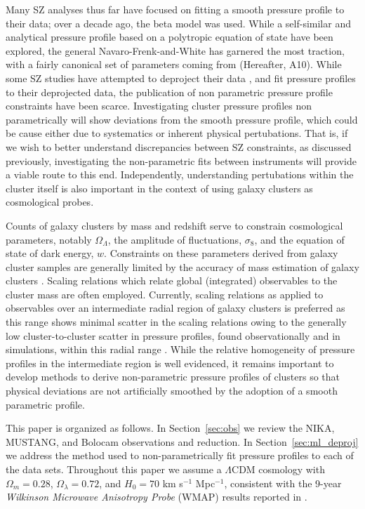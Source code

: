 \documentclass[iop,numberedappendix,apj]{emulateapj}
\begin{document}
Many SZ analyses thus far have focused on fitting a smooth pressure profile to their data; over a decade ago, the beta model
\citep{cavaliere1978} was used. While a self-similar \citep{mroczkowski2009} and analytical pressure profile based on a
polytropic equation of state \citep{bulbul2010} have been explored, the general Navaro-Frenk-and-White
\citep[gNFW][]{nagai2007} has garnered the most traction, with a fairly canonical set of parameters coming from
\citet{arnaud2010} (Hereafter, A10). While some SZ studies have attempted to deproject their data \citep[e.g.][]{sayers2013},
and fit pressure profiles to their deprojected data, the publication of non parametric pressure profile constraints have
been scarce. Investigating cluster pressure profiles non parametrically will show deviations from the smooth pressure profile,
which could be cause either due to systematics or inherent physical pertubations. That is, if we wish to better understand
discrepancies between SZ constraints, as discussed previously, investigating the non-parametric fits between instruments will
provide a viable route to this end. Independently, understanding pertubations within the cluster itself is also important in
the context of using galaxy clusters as cosmological probes.

Counts of galaxy clusters by mass and redshift serve to constrain cosmological parameters, notably $\Omega_{\Lambda}$,
the amplitude of fluctuations, $\sigma_8$, and the equation of state of dark energy, $w$. Constraints on these
parameters derived from galaxy cluster samples are generally limited by the accuracy of mass estimation of 
galaxy clusters \citep[e.g.][]{hasselfield2013, reichardt2013}. Scaling relations which relate global (integrated) observables
to the cluster mass are often employed. Currently, scaling relations as applied to observables over an intermediate radial
region of galaxy clusters is preferred as this range shows minimal scatter in the scaling relations \citep[e.g.][]{kravtsov2012}
owing to the generally low cluster-to-cluster scatter in pressure profiles, found observationally and in simulations,
within this radial range \citep[e.g.][]{borgani2004,nagai2007,arnaud2010,bonamente2012,planck2013a,sayers2013}.
While the relative homogeneity of pressure profiles in the intermediate region is well evidenced, it remains important to
develop methods to derive non-parametric pressure profiles of clusters so that physical deviations are not artificially
smoothed by the adoption of a smooth parametric profile. 

This paper is organized as follows. In Section~\ref{sec:obs} we review the NIKA, MUSTANG, and Bolocam observations and reduction. 
In Section~\ref{sec:ml_deproj} we address the method used to non-parametrically fit pressure profiles to each of the data sets.
Throughout this paper we assume a $\Lambda$CDM cosmology with $\Omega_m = 0.28$, $\Omega_{\lambda} = 0.72$, and $H_0 = 70$ 
km s$^{-1}$ Mpc$^{-1}$, consistent with the 9-year \emph{Wilkinson Microwave Anisotropy Probe} (WMAP) results reported
in \cite{hinshaw2013}.
\end{document}
